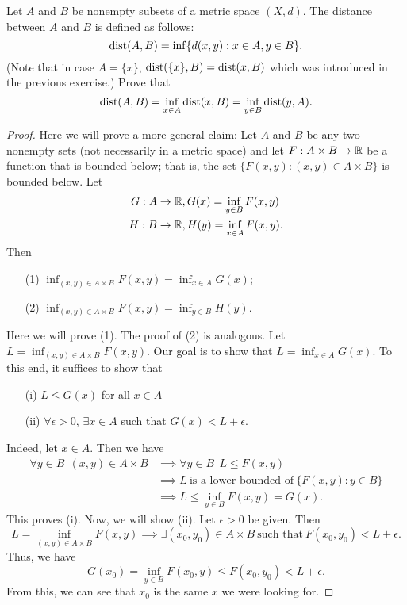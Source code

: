 \documentclass[a4paper]{article}
\begin{document}
\begin{problem}
    Let \( A  \) and \( B  \) be nonempty subsets of a metric space \( (X,d) \). The distance between \( A  \) and \( B  \) is defined as follows:
    \[  \operatorname{dist}(A,B)  = \inf \{  d(x,y) : x \in A , y \in B \}. \]
    (Note that in case \( A = \{ x  \}  \), \( \operatorname{dist}(\{ x \}, B ) = \operatorname{dist}(x,B) \) which was introduced in the previous exercise.) Prove that 
    \[  \operatorname{dist}(A,B) = \inf_{x \in A} \operatorname{dist}(x,B) = \inf_{y \in B} \operatorname{dist}(y,A). \]
\end{problem}
\begin{proof}
Here we will prove a more general claim: 
Let \( A  \) and \( B  \) be any two nonempty sets (not necessarily in a metric space) and let \( F: A \times B \to \mathbb{R}  \) be a function that is bounded below; that is, the set \( \{ F(x,y) : (x,y) \in A \times B  \}  \) is bounded below. Let 
\begin{align*}
    G: A \to \mathbb{R} &, G(x) = \inf_{y \in B} F(x,y) \\
    H: B \to \mathbb{R} &, H(y) = \inf_{x \in A } F(x,y).
\end{align*}
Then
\begin{enumerate}
    \item[(1)] \( \inf_{(x,y) \in A \times B } F(x,y) = \inf_{x \in A } G(x) \);
    \item[(2)] \( \inf_{(x,y) \in A \times B } F(x,y) = \inf_{y \in B} H(y) \).
\end{enumerate}
Here we will prove (1). The proof of (2) is analogous.
Let \( L = \inf_{(x,y) \in A \times B} F(x,y) \). Our goal is to show that \( L = \inf_{x \in A } G(x) \). To this end, it suffices to show that 
\begin{enumerate}
    \item[(i)] \( L \leq G(x)  \) for all \( x \in A  \)
    \item[(ii)] \( \forall \epsilon > 0  \), \( \exists x \in A  \) such that \( G(x) < L + \epsilon  \).
\end{enumerate}
Indeed, let \( x \in A  \). Then we have 
\begin{align*}
    \forall y \in B \ \ (x,y) \in A \times B &\implies \forall y \in B \ \ L \leq F(x,y) \\
                                             &\implies  L \  \text{is a lower bounded of} \ \{ F(x,y) : y \in B \} \\
                                             &\implies  L \leq \inf_{y \in B} F(x,y) = G(x).
\end{align*}
This proves (i). Now, we will show (ii). Let \( \epsilon > 0  \) be given. Then
\[  L = \inf_{(x,y) \in A \times B } F(x,y) \implies \exists ({x}_{0}, {y}_{0}) \in A \times B \ \text{such that} \ F({x}_{0}, {y}_{0}) < L + \epsilon. \]
Thus, we have 
\[  G({x}_{0}) = \inf_{y \in B} F({x}_{0}, y) \leq F({x}_{0}, {y}_{0}) < L + \epsilon. \]
From this, we can see that \( {x}_{0} \) is the same \( x  \) we were looking for.
\end{proof}
\end{document}
